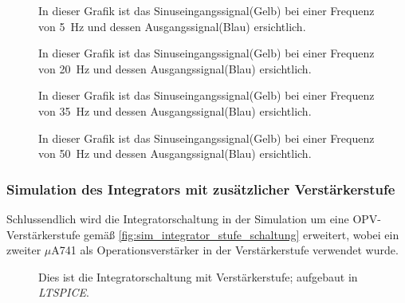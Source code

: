 \documentclass[12pt,english,ngerman]{scrartcl}
\begin{document}
\begin{figure}[H]
  \centering
    \caption{In dieser Grafik ist das Sinuseingangssignal(Gelb) bei einer Frequenz von
    \SI{5}{\Hz} und dessen Ausgangssignal(Blau) ersichtlich.}
  \label{fig:mess_integrator_5hz}
\end{figure}

\begin{figure}[H]
  \centering
    \caption{In dieser Grafik ist das Sinuseingangssignal(Gelb) bei einer Frequenz von
    \SI{20}{\Hz} und dessen Ausgangssignal(Blau) ersichtlich.}
  \label{fig:mess_integrator_20hz}
\end{figure}

\begin{figure}[H]
  \centering
    \caption{In dieser Grafik ist das Sinuseingangssignal(Gelb) bei einer Frequenz von
    \SI{35}{\Hz} und dessen Ausgangssignal(Blau) ersichtlich.}
  \label{fig:mess_integrator_35hz}
\end{figure}

\begin{figure}[H]
  \centering
    \caption{In dieser Grafik ist das Sinuseingangssignal(Gelb) bei einer Frequenz von
    \SI{50}{\Hz} und dessen Ausgangssignal(Blau) ersichtlich.}
  \label{fig:mess_integrator_50hz}
\end{figure}


\subsubsection{Simulation des Integrators mit zusätzlicher Verstärkerstufe}

Schlussendlich wird die Integratorschaltung in der Simulation um eine
OPV-Verstärkerstufe gemäß \autoref{fig:sim_integrator_stufe_schaltung}
erweitert, wobei ein zweiter $\mu$A741 als Operationsverstärker in der
Verstärkerstufe verwendet wurde.

\begin{figure}[H]
  \centering
  \caption{Dies ist die Integratorschaltung mit Verstärkerstufe; aufgebaut in \textit{LTSPICE}.}
  \label{fig:sim_integrator_stufe_schaltung}
\end{figure}
\end{document}
